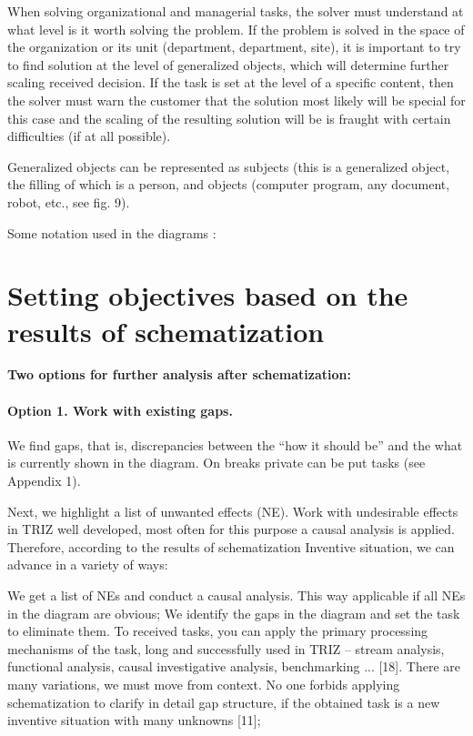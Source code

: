 When solving organizational and managerial tasks, the solver must understand
at what level is it worth solving the problem. If the problem is solved in the
space of the organization or its unit (department, department, site), it is
important to try to find solution at the level of generalized objects, which
will determine further scaling received decision. If the task is set at the
level of a specific content, then the solver must warn the customer that the
solution most likely will be special for this case and the scaling of the
resulting solution will be is fraught with certain difficulties (if at all
possible).

Generalized objects can be represented as subjects (this is a generalized
object, the filling of which is a person, and objects (computer
program, any document, robot, etc., see fig. 9).

Some notation used in the diagrams :


\section{Setting objectives based on the results of schematization}

\textbf{Two options for further analysis after schematization:}

\paragraph{Option 1. Work with existing gaps.}
We find gaps, that is, discrepancies between the “how it should be” and the
what is currently shown in the diagram. On breaks private can be put tasks
(see Appendix 1).

Next, we highlight a list of unwanted effects (NE). Work with undesirable
effects in TRIZ well developed, most often for this purpose a causal analysis
is applied. Therefore, according to the results of schematization Inventive
situation, we can advance in a variety of ways:

We get a list of NEs and conduct a causal analysis. This way applicable if all
NEs in the diagram are obvious; We identify the gaps in the diagram and set
the task to eliminate them. To received tasks, you can apply the primary
processing mechanisms of the task, long and successfully used in TRIZ --
stream analysis, functional analysis, causal investigative analysis,
benchmarking ... [18]. There are many variations, we must move from
context. No one forbids applying schematization to clarify in detail gap
structure, if the obtained task is a new inventive situation with many
unknowns [11];

